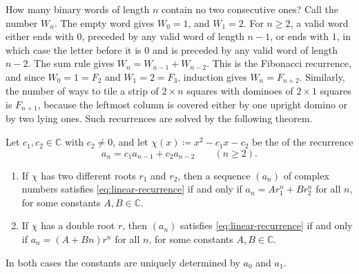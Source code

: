 How many binary words of length $n$ contain no two consecutive ones? Call the number $W_n$. The empty word gives $W_0=1$, and $W_1=2$. For $n\ge2$, a valid word either ends with $0$, preceded by any valid word of length $n-1$, or ends with $1$, in which case the letter before it is $0$ and is preceded by any valid word of length $n-2$. The sum rule gives $W_n=W_{n-1}+W_{n-2}$. This is the Fibonacci recurrence, and since $W_0=1=F_2$ and $W_1=2=F_3$, induction gives $W_n=F_{n+2}$. Similarly, the number of ways to tile a strip of $2\times n$ squares with dominoes of $2\times1$ squares is $F_{n+1}$, because the leftmost column is covered either by one upright domino or by two lying ones. Such recurrences are solved by the following theorem.

\begin{theorem}
\label{thm:linear-recurrence}
Let $c_1,c_2\in\mathbb C$ with $c_2\ne0$, and let $\chi(x)\coloneqq x^2-c_1x-c_2$ be the  of the recurrence
\begin{equation}
a_n=c_1a_{n-1}+c_2a_{n-2}\qquad(n\ge2).
\label{eq:linear-recurrence}
\end{equation}
\begin{enumerate}
\item If $\chi$ has two different roots $r_1$ and $r_2$, then a sequence $(a_n)$ of complex numbers satisfies \eqref{eq:linear-recurrence} if and only if $a_n=Ar_1^n+Br_2^n$ for all $n$, for some constants $A,B\in\mathbb C$.
\item If $\chi$ has a double root $r$, then $(a_n)$ satisfies \eqref{eq:linear-recurrence} if and only if $a_n=(A+Bn)r^n$ for all $n$, for some constants $A,B\in\mathbb C$.
\end{enumerate}
In both cases the constants are uniquely determined by $a_0$ and $a_1$.
\end{theorem}


